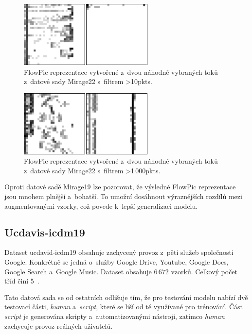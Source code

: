 \begin{figure}[H]
	\centering
	\includegraphics[width=0.6\textwidth]{obrazky-figures/10_m22_flowpics.png}
	\caption{FlowPic reprezentace vytvořené z~dvou náhodně vybraných toků z~datové sady Mirage22 s~filtrem >10pkts.}
	\label{10_m22_flowpic}
\end{figure}

\begin{figure}[H]
	\centering
	\includegraphics[width=0.6\textwidth]{obrazky-figures/1000_m22_flowpics.png}
	\caption{FlowPic reprezentace vytvořené z~dvou náhodně vybraných toků z~datové sady Mirage22 s~filtrem >1\,000pkts.}
	\label{1000_m22_flowpic}
\end{figure}

Oproti datové sadě Mirage19 lze pozorovat, že výsledné FlowPic reprezentace jsou mnohem plnější a~bohatší. To umožní dosáhnout výraznějších rozdílů mezi augmentovanými vzorky, což povede k~lepší generalizaci modelu.

\subsection{Ucdavis-icdm19}
\label{ucdavis_section}
Dataset ucdavid-icdm19 obsahuje zachycený provoz z~pěti služeb společnosti Google. Konkrétně se jedná o~služby Google Drive, Youtube, Google Docs, Google Search a~Google Music. Dataset obsahuje 6\,672 vzorků. Celkový počet tříd činí 5~\cite{usdavis}.

Tato datová sada se od ostatních odlišuje tím, že pro testování modelu nabízí dvě testovací části, \textit{human} a~\textit{script}, které se liší od té využívané pro trénování. Část \textit{script} je generována skripty a~automatizovanými nástroji, zatímco \textit{human} zachycuje provoz reálných uživatelů.

